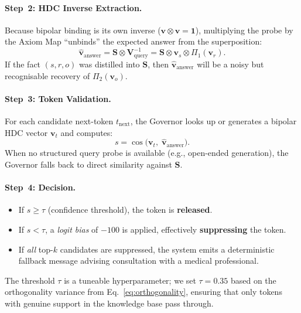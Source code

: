 \documentclass[11pt,a4paper]{article}
\begin{document}
\paragraph{Step~2: HDC Inverse Extraction.}
Because bipolar binding is its own inverse ($\mathbf{v} \otimes \mathbf{v}
= \mathbf{1}$), multiplying the probe by the Axiom Map ``unbinds'' the
expected answer from the superposition:
\begin{equation}
    \hat{\mathbf{v}}_{\text{answer}} =
    \mathbf{S} \otimes \mathbf{V}_{\text{query}}^{-1}
    = \mathbf{S} \otimes \mathbf{v}_{s} \otimes
    \Pi_1(\mathbf{v}_{r}).
    \label{eq:extraction}
\end{equation}
If the fact $(s, r, o)$ was distilled into $\mathbf{S}$, then
$\hat{\mathbf{v}}_{\text{answer}}$ will be a noisy but recognisable
recovery of $\Pi_2(\mathbf{v}_{o})$.

\paragraph{Step~3: Token Validation.}
For each candidate next-token $t_{\text{next}}$, the Governor looks up or
generates a bipolar HDC vector $\mathbf{v}_{t}$ and computes:
\begin{equation}
    s = \cos\bigl(\mathbf{v}_{t},\;
    \hat{\mathbf{v}}_{\text{answer}}\bigr).
    \label{eq:safety}
\end{equation}
When no structured query probe is available (e.g., open-ended generation),
the Governor falls back to direct similarity against $\mathbf{S}$.

\paragraph{Step~4: Decision.}
\begin{itemize}[nosep]
    \item If $s \geq \tau$ (confidence threshold), the token is
          \textcolor{axiomsafe}{\textbf{released}}.
    \item If $s < \tau$, a \emph{logit bias} of $-100$ is applied,
          effectively \textcolor{axiomwarn}{\textbf{suppressing}} the token.
    \item If \emph{all} top-$k$ candidates are suppressed, the system
          emits a deterministic fallback message advising consultation
          with a medical professional.
\end{itemize}

The threshold $\tau$ is a tuneable hyperparameter; we set $\tau = 0.35$ based
on the orthogonality variance from Eq.~\eqref{eq:orthogonality}, ensuring
that only tokens with genuine support in the knowledge base pass through.
\end{document}
